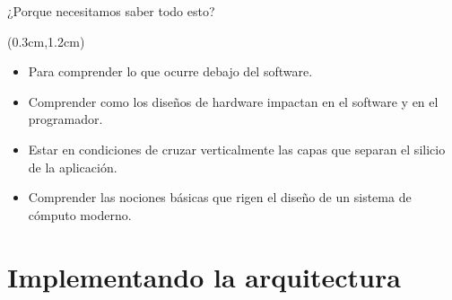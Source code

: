 \documentclass[table,dvipsnames,aspectratio=169]{beamer}
\begin{document}
\begin{frame}{¿Porque necesitamos saber todo esto?}
 \begin{textblock*}{\textwidth}(0.3cm,1.2cm)
  \begin{itemize}[<+(1)->] \justifying \parskip 0.5cm
   \item Para comprender \textcolor{furfiBlue}{lo que ocurre debajo del software}.
   \item Comprender como los diseños de hardware \textcolor{furfiBlue}{impactan en el software} y en el programador.
   \item Estar en condiciones de cruzar verticalmente las capas que \textcolor{furfiBlue}{separan el silicio} de la aplicación.
   \item Comprender las nociones básicas que \textcolor{furfiBlue}{rigen el diseño de un sistema} de cómputo moderno.
  \end{itemize}
 \end{textblock*}
\end{frame}

\section{Implementando la arquitectura}
\end{document}
